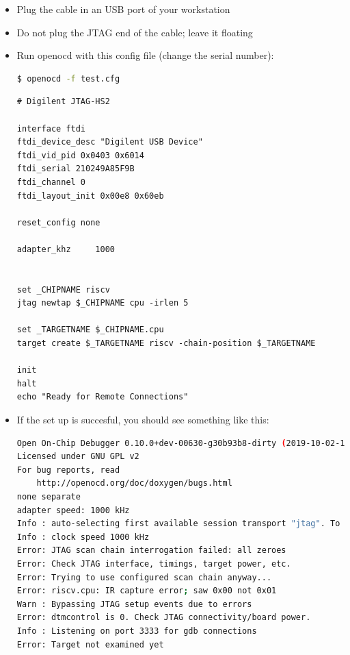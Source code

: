 \documentclass{article}
\begin{document}
	\vspace{-\topsep}
	\begin{itemize}
	\item Plug the cable in an USB port of your workstation
	\item Do not plug the JTAG end of the cable; leave it floating
	\item Run openocd with this config file (change the serial number):
	
	\begin{lstlisting}[language=bash]
    $ openocd -f test.cfg
    \end{lstlisting}
    
    \begin{lstlisting}
# Digilent JTAG-HS2

interface ftdi
ftdi_device_desc "Digilent USB Device"
ftdi_vid_pid 0x0403 0x6014
ftdi_serial 210249A85F9B
ftdi_channel 0						
ftdi_layout_init 0x00e8 0x60eb

reset_config none

adapter_khz     1000


set _CHIPNAME riscv
jtag newtap $_CHIPNAME cpu -irlen 5 

set _TARGETNAME $_CHIPNAME.cpu
target create $_TARGETNAME riscv -chain-position $_TARGETNAME

init
halt
echo "Ready for Remote Connections"
    \end{lstlisting}
    
    \item If the set up is succesful, you should see something like this:
    
    \begin{lstlisting}[language=bash]
Open On-Chip Debugger 0.10.0+dev-00630-g30b93b8-dirty (2019-10-02-14:34)
Licensed under GNU GPL v2
For bug reports, read
	http://openocd.org/doc/doxygen/bugs.html
none separate
adapter speed: 1000 kHz
Info : auto-selecting first available session transport "jtag". To override use 'transport select <transport>'.
Info : clock speed 1000 kHz
Error: JTAG scan chain interrogation failed: all zeroes
Error: Check JTAG interface, timings, target power, etc.
Error: Trying to use configured scan chain anyway...
Error: riscv.cpu: IR capture error; saw 0x00 not 0x01
Warn : Bypassing JTAG setup events due to errors
Error: dtmcontrol is 0. Check JTAG connectivity/board power.
Info : Listening on port 3333 for gdb connections
Error: Target not examined yet
    \end{lstlisting}
	
	\end{itemize}
	
\end{document}
